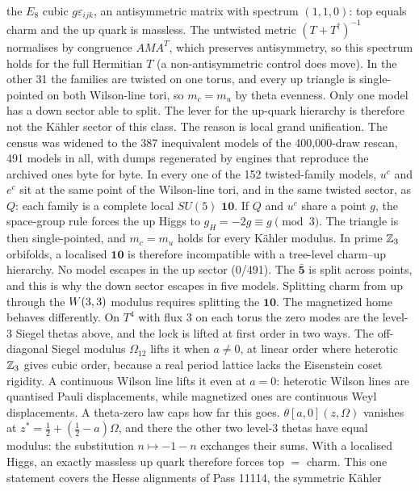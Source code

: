 the $E_8$ cubic $g\varepsilon_{ijk}$, an antisymmetric matrix with spectrum $(1,1,0)$: top equals charm and the up quark
is massless. The untwisted metric $(T+T^\dagger)^{-1}$ normalises by congruence $AMA^{T}$, which preserves
antisymmetry, so this spectrum holds for the full Hermitian $T$ (a non-antisymmetric control does move). In the other
31 the families are twisted on one torus, and every up triangle is single-pointed on both Wilson-line tori, so
$m_c=m_u$ by theta evenness. Only one model has a down sector able to split. The lever for the up-quark hierarchy is
therefore not the K\"ahler sector of this class. 
The reason is local grand unification. The census was widened to the 387 inequivalent models of the
400{,}000-draw rescan, 491 models in all, with dumps regenerated by engines that reproduce the archived ones byte for
byte. In every one of the 152 twisted-family models, $u^c$ and $e^c$ sit at the same point of the Wilson-line tori, and
in the same twisted sector, as $Q$: each family is a complete local $SU(5)$ $\mathbf{10}$. If $Q$ and $u^c$ share a
point $g$, the space-group rule forces the up Higgs to $g_H=-2g\equiv g\pmod 3$. The triangle is then single-pointed,
and $m_c=m_u$ holds for every K\"ahler modulus. In prime $\mathbb{Z}_3$ orbifolds, a localised $\mathbf{10}$ is therefore
incompatible with a tree-level charm--up hierarchy. No model escapes in the up sector (0/491). The $\bar{\mathbf5}$ is
split across points, and this is why the down sector escapes in five models. Splitting charm from up through the $W(3,3)$
modulus requires splitting the $\mathbf{10}$. 
The magnetized home behaves differently. On $T^4$ with flux 3 on each torus the zero modes are the level-3 Siegel
thetas above, and the lock is lifted at first order in two ways. The off-diagonal Siegel modulus $\Omega_{12}$ lifts it
when $a\neq0$, at linear order where heterotic $\mathbb{Z}_3$ gives cubic order, because a real period lattice lacks the
Eisenstein coset rigidity. A continuous Wilson line lifts it even at $a=0$: heterotic Wilson lines are quantised Pauli
displacements, while magnetized ones are continuous Weyl displacements. A theta-zero law caps how far this goes.
$\theta[a,0](z,\Omega)$ vanishes at $z^*=\tfrac12+(\tfrac12-a)\Omega$, and there the other two level-3 thetas have equal
modulus: the substitution $n\mapsto-1-n$ exchanges their sums. With a localised Higgs, an exactly massless up quark
therefore forces top $=$ charm. This one statement covers the Hesse alignments of Pass 11114, the symmetric K\"ahler

